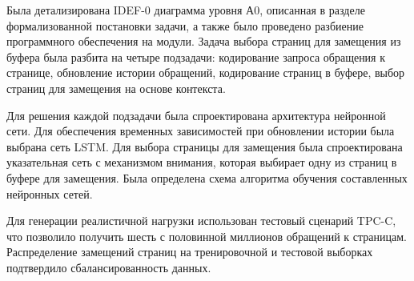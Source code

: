 Была детализирована IDEF-0 диаграмма уровня А0, описанная в разделе формализованной постановки задачи, а также было проведено разбиение программного обеспечения на модули.
Задача выбора страниц для замещения из буфера была разбита на четыре подзадачи: кодирование запроса обращения к странице, обновление истории обращений, кодирование страниц в буфере, выбор страниц для замещения на основе контекста.

Для решения каждой подзадачи была спроектирована архитектура нейронной сети.
Для обеспечения временных зависимостей при обновлении истории была выбрана сеть LSTM.
Для выбора страницы для замещения была спроектирована указательная сеть с механизмом внимания, которая выбирает одну из страниц в буфере для замещения.
Была определена схема алгоритма обучения составленных нейронных сетей.

Для генерации реалистичной нагрузки использован тестовый сценарий TPC-C, что позволило получить шесть с половинной миллионов обращений к страницам.
Распределение замещений страниц на тренировочной и тестовой выборках подтвердило сбалансированность данных.